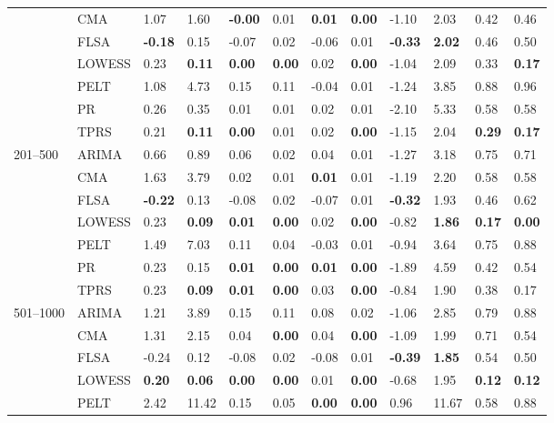\begin{table}[ht]
\begin{tabular}{llllllllllll}
   & CMA & 1.07 & 1.60 & \textbf{-0.00} & 0.01 & \textbf{0.01} & \textbf{0.00} & -1.10 & 2.03 & 0.42 & 0.46 \\ 
   & FLSA & \textbf{-0.18} & 0.15 & -0.07 & 0.02 & -0.06 & 0.01 & \textbf{-0.33} & \textbf{2.02} & 0.46 & 0.50 \\ 
   & LOWESS & 0.23 & \textbf{0.11} & \textbf{0.00} & \textbf{0.00} & 0.02 & \textbf{0.00} & -1.04 & 2.09 & 0.33 & \textbf{0.17} \\ 
   & PELT & 1.08 & 4.73 & 0.15 & 0.11 & -0.04 & 0.01 & -1.24 & 3.85 & 0.88 & 0.96 \\ 
   & PR & 0.26 & 0.35 & 0.01 & 0.01 & 0.02 & 0.01 & -2.10 & 5.33 & 0.58 & 0.58 \\ 
   & TPRS & 0.21 & \textbf{0.11} & \textbf{0.00} & 0.01 & 0.02 & \textbf{0.00} & -1.15 & 2.04 & \textbf{0.29} & \textbf{0.17} \\ 
  201–500 & ARIMA & 0.66 & 0.89 & 0.06 & 0.02 & 0.04 & 0.01 & -1.27 & 3.18 & 0.75 & 0.71 \\ 
   & CMA & 1.63 & 3.79 & 0.02 & 0.01 & \textbf{0.01} & 0.01 & -1.19 & 2.20 & 0.58 & 0.58 \\ 
   & FLSA & \textbf{-0.22} & 0.13 & -0.08 & 0.02 & -0.07 & 0.01 & \textbf{-0.32} & 1.93 & 0.46 & 0.62 \\ 
   & LOWESS & 0.23 & \textbf{0.09} & \textbf{0.01} & \textbf{0.00} & 0.02 & \textbf{0.00} & -0.82 & \textbf{1.86} & \textbf{0.17} & \textbf{0.00} \\ 
   & PELT & 1.49 & 7.03 & 0.11 & 0.04 & -0.03 & 0.01 & -0.94 & 3.64 & 0.75 & 0.88 \\ 
   & PR & 0.23 & 0.15 & \textbf{0.01} & \textbf{0.00} & \textbf{0.01} & \textbf{0.00} & -1.89 & 4.59 & 0.42 & 0.54 \\ 
   & TPRS & 0.23 & \textbf{0.09} & \textbf{0.01} & \textbf{0.00} & 0.03 & \textbf{0.00} & -0.84 & 1.90 & 0.38 & 0.17 \\ 
  501–1000 & ARIMA & 1.21 & 3.89 & 0.15 & 0.11 & 0.08 & 0.02 & -1.06 & 2.85 & 0.79 & 0.88 \\ 
   & CMA & 1.31 & 2.15 & 0.04 & \textbf{0.00} & 0.04 & \textbf{0.00} & -1.09 & 1.99 & 0.71 & 0.54 \\ 
   & FLSA & -0.24 & 0.12 & -0.08 & 0.02 & -0.08 & 0.01 & \textbf{-0.39} & \textbf{1.85} & 0.54 & 0.50 \\ 
   & LOWESS & \textbf{0.20} & \textbf{0.06} & \textbf{0.00} & \textbf{0.00} & 0.01 & \textbf{0.00} & -0.68 & 1.95 & \textbf{0.12} & \textbf{0.12} \\ 
   & PELT & 2.42 & 11.42 & 0.15 & 0.05 & \textbf{0.00} & \textbf{0.00} & 0.96 & 11.67 & 0.58 & 0.88 \\ 

\end{tabular}
\end{table}
